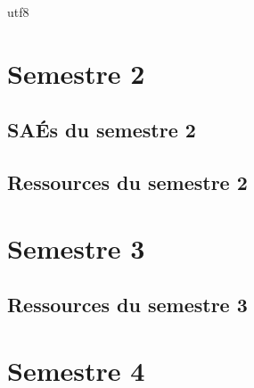 utf8\documentclass[10pt,french]{article} %
\begin{document}
\section{Semestre 2}
\def\sem{B} %
%
\subsection{SAÉs du semestre 2}
%
%
\subsection{Ressources du semestre 2}
%
%
%
%
%
%
%
\newpage


\section{Semestre 3}
\def\sem{C} %
%
%
%
\subsection{Ressources du semestre 3}



\section{Semestre 4}
\def\sem{D} %
%
%
%
\end{document}
